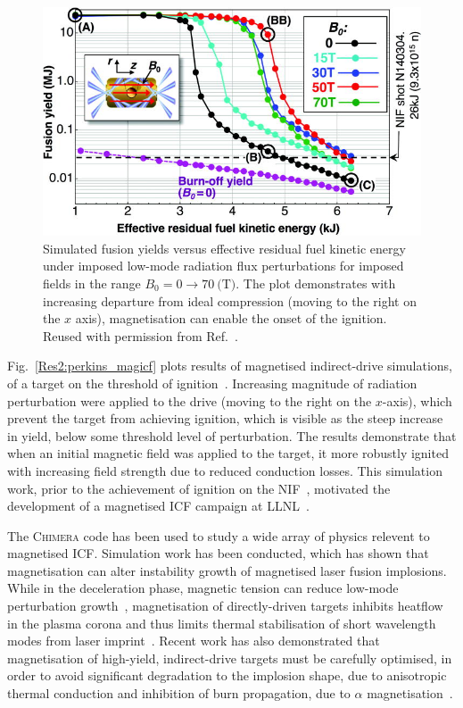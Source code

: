 \begin{figure}[t!]
    \includegraphics[width=0.75\linewidth]{Results2/Images/magicf_perkins.jpeg}
    \centering
    \caption{Simulated fusion yields versus effective residual fuel kinetic energy under imposed low-mode radiation flux perturbations for imposed fields in the range $B_0=0\rightarrow70\ \text{(T)}$.
    The plot demonstrates with increasing departure from ideal compression (moving to the right on the $x$ axis), magnetisation can enable the onset of the ignition.
    Reused with permission from Ref.~\cite{perkins_potential_2017}.}%
    \label{fig:Res2_perkins_magicf}
\end{figure}

Fig.~\ref{Res2:perkins_magicf} plots results of magnetised indirect-drive simulations, of a target on the threshold of ignition~\cite{perkins_potential_2017}.
Increasing magnitude of radiation perturbation were applied to the drive (moving to the right on the $x$-axis), which prevent the target from achieving ignition, which is visible as the steep increase in yield, below some threshold level of perturbation.
The results demonstrate that when an initial magnetic field was applied to the target, it more robustly ignited with increasing field strength due to reduced conduction losses.
This simulation work, prior to the achievement of ignition on the \ac{NIF}~\cite{zylstra_burning_2022}, motivated the development of a magnetised \ac{ICF} campaign at \ac{LLNL}~\cite{moody_magnetized_2022}.

The \textsc{Chimera} code has been used to study a wide array of physics relevent to magnetised \ac{ICF}.
Simulation work has been conducted, which has shown that magnetisation can alter instability growth of magnetised laser fusion implosions.
While in the deceleration phase, magnetic tension can reduce low-mode perturbation growth~\cite{walsh_perturbation_2019}, magnetisation of directly-driven targets inhibits heatflow in the plasma corona and thus limits thermal stabilisation of short wavelength modes from laser imprint~\cite{walsh_magnetized_2020}.
Recent work has also demonstrated that magnetisation of high-yield, indirect-drive targets must be carefully optimised, in order to avoid significant degradation to the implosion shape, due to anisotropic thermal conduction and inhibition of burn propagation, due to $\alpha$ magnetisation~\cite{oneill_modelling_2023}.

